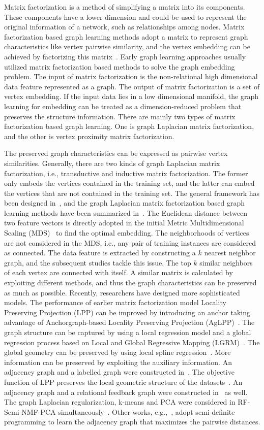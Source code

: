 Matrix factorization is a method of simplifying a matrix into its components. These components have a lower dimension and could be used to represent the original information of a network, such as relationships among nodes. Matrix factorization based graph learning methods adopt a matrix to represent graph characteristics like vertex pairwise similarity, and the vertex embedding can be achieved by factorizing this matrix~. Early graph learning approaches usually utilized matrix factorization based methods to solve the graph embedding problem. The input of matrix factorization is the non-relational high dimensional data feature represented as a graph. The output of matrix factorization is a set of vertex embedding. If the input data lies in a low dimensional manifold, the graph learning for embedding can be treated as a dimension-reduced problem that preserves the structure information. There are mainly two types of matrix factorization based graph learning. One is graph Laplacian matrix factorization, and the other is vertex proximity matrix factorization.

The preserved graph characteristics can be expressed as pairwise vertex similarities. Generally, there are two kinds of graph Laplacian matrix factorization, i.e., transductive and inductive matrix factorization. The former only embeds the vertices contained in the training set, and the latter can embed the vertices that are not contained in the training set. The general framework has been designed in~, and the graph Laplacian matrix factorization based graph learning methods have been summarized in~. The Euclidean distance between two feature vectors is directly adopted in the initial Metric Multidimensional Scaling (MDS)~ to find the optimal embedding. The neighborhoods of vertices are not considered in the MDS, i.e., any pair of training instances are considered as connected. The data feature is extracted by constructing a $k$ nearest neighbor graph, and the subsequent studies  tackle this issue. The top $k$ similar neighbors of each vertex are connected with itself. A similar matrix is calculated by exploiting different methods, and thus the graph characteristics can be preserved as much as possible.
Recently, researchers have designed more sophisticated models. The performance of earlier matrix factorization model Locality Preserving Projection (LPP) can be improved by introducing an anchor taking advantage of Anchorgraph-based Locality Preserving Projection (AgLPP)~. The graph structure can be captured by using a local regression model and a global regression process based on Local and Global Regressive Mapping (LGRM)~. The global geometry can be preserved by using local spline regression~.
More information can be preserved by exploiting the auxiliary information. An adjacency graph and a labelled graph were constructed in~. The objective function of LPP preserves the local geometric structure of the datasets~. An adjacency graph and a relational feedback graph were constructed in~ as well. The graph Laplacian regularization, k-means and PCA were considered in RF-Semi-NMF-PCA simultaneously~. Other works, e.g.,~, adopt semi-definite programming to learn the adjacency graph that maximizes the pairwise distances.

